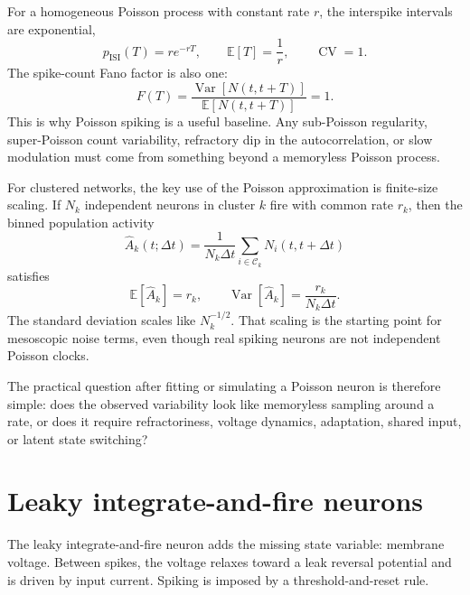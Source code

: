 For a homogeneous Poisson process with constant rate $r$, the interspike intervals are exponential,
%
\begin{equation}
  p_{\mathrm{ISI}}(T)=r e^{-rT},
  \qquad
  \mathbb{E}[T]=\frac{1}{r},
  \qquad
  \operatorname{CV}=1 .
  \label{eq:poisson-isi}
\end{equation}
%
The spike-count Fano factor is also one:
%
\begin{equation}
  F(T)
  =
  \frac{\operatorname{Var}[N(t,t+T)]}{\mathbb{E}[N(t,t+T)]}
  =
  1 .
  \label{eq:poisson-fano-one}
\end{equation}
%
This is why Poisson spiking is a useful baseline. Any sub-Poisson regularity, super-Poisson count variability, refractory dip in the autocorrelation, or slow modulation must come from something beyond a memoryless Poisson process.

For clustered networks, the key use of the Poisson approximation is finite-size scaling. If $N_k$ independent neurons in cluster $k$ fire with common rate $r_k$, then the binned population activity
%
\begin{equation}
  \widehat A_k(t;\Delta t)
  =
  \frac{1}{N_k\Delta t}
  \sum_{i\in\mathcal{C}_k}N_i(t,t+\Delta t)
  \label{eq:poisson-population-activity}
\end{equation}
%
satisfies
%
\begin{equation}
  \mathbb{E}[\widehat A_k]=r_k,
  \qquad
  \operatorname{Var}[\widehat A_k]
  =
  \frac{r_k}{N_k\Delta t}.
  \label{eq:poisson-population-variance}
\end{equation}
%
The standard deviation scales like $N_k^{-1/2}$. That scaling is the starting point for mesoscopic noise terms, even though real spiking neurons are not independent Poisson clocks.

The practical question after fitting or simulating a Poisson neuron is therefore simple: does the observed variability look like memoryless sampling around a rate, or does it require refractoriness, voltage dynamics, adaptation, shared input, or latent state switching?

\section{Leaky integrate-and-fire neurons}
\label{sec:lif-neurons-project}

The leaky integrate-and-fire neuron adds the missing state variable: membrane voltage. Between spikes, the voltage relaxes toward a leak reversal potential and is driven by input current. Spiking is imposed by a threshold-and-reset rule.

